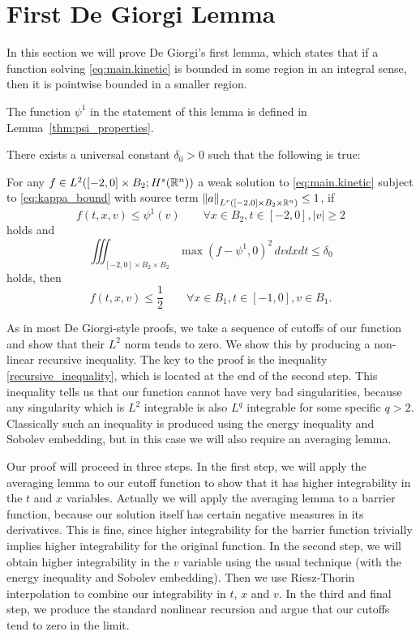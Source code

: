 \section{First De Giorgi Lemma}\label{sec:DG1.kinetic}

In this section we will prove De Giorgi's first lemma, which states that if a function solving \eqref{eq:main.kinetic} is bounded in some region in an integral sense, then it is pointwise bounded in a smaller region.  

The function $\psi^1$ in the statement of this lemma is defined in Lemma~\ref{thm:psi_properties}.  

\begin{proposition}\label{thm:DG1.kinetic}
There exists a universal constant $\delta_0 > 0$ such that the following is true:

For any $f \in L^2([-2,0]\times B_2; H^s(\mathbb{R}^n))$ a weak solution to \eqref{eq:main.kinetic} subject to \eqref{eq:kappa_bound} with source term $\left\lVert a\right\rVert_{L^{r}([-2,0]\times B_2 \times\mathbb{R}^n)} \leq 1$, if
\[ f(t,x,v) \leq \psi^1(v) \qquad \forall x \in B_2, t \in [-2,0], |v| \geq 2 \]
holds and 
\[ \iiint_{[-2,0]\times B_2\times B_2} \max(f-\psi^1,0)^2 \, dvdxdt \leq \delta_0 \]
holds, then
\[ f(t,x,v) \leq \frac{1}{2} \qquad \forall x \in B_1, t \in [-1,0], v \in B_1. \]
\end{proposition}

As in most De Giorgi-style proofs, we take a sequence of cutoffs of our function and show that their $L^2$ norm tends to zero.  We show this by producing a non-linear recursive inequality.
The key to the proof is the inequality \eqref{recursive_inequality}, which is located at the end of the second step.  This inequality tells us that our function cannot have very bad singularities, because any singularity which is $L^2$ integrable is also $L^q$ integrable for some specific $q > 2$.  Classically such an inequality is produced using the energy inequality and Sobolev embedding, but in this case we will also require an averaging lemma.  

Our proof will proceed in three steps.  In the first step, we will apply the averaging lemma to our cutoff function to show that it has higher integrability in the $t$ and $x$ variables.  Actually we will apply the averaging lemma to a barrier function, because our solution itself has certain negative measures in its derivatives.  This is fine, since higher integrability for the barrier function trivially implies higher integrability for the original function.  In the second step, we will obtain higher integrability in the $v$ variable using the usual technique (with the energy inequality and Sobolev embedding).  Then we use Riesz-Thorin interpolation to combine our integrability in $t$, $x$ and $v$.  In the third and final step, we produce the standard nonlinear recursion and argue that our cutoffs tend to zero in the limit. 

